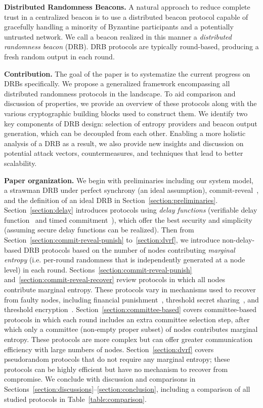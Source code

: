 \textbf{Distributed Randomness Beacons.}
A natural approach to reduce complete trust in a centralized beacon is to use a distributed beacon protocol capable of gracefully handling a minority of Byzantine participants and a potentially untrusted network. We call a beacon realized in this manner a \textit{distributed randomness beacon} (DRB). DRB protocols are typically round-based, producing a fresh random output in each round.

\textbf{Contribution.} The goal of the paper is to systematize the current progress on DRBs specifically. We propose a generalized framework encompassing all distributed randomness protocols in the landscape. To aid comparison and discussion of properties, we provide an overview of these protocols along with the various cryptographic building blocks used to construct them. We identify two key components of DRB design: selection of entropy providers and beacon output generation, which can be decoupled from each other. Enabling a more holistic analysis of a DRB as a result, we also provide new insights and discussion on potential attack vectors, countermeasures, and techniques that lead to better scalability.

\textbf{Paper organization.} We begin with preliminaries including our system model, a strawman DRB under perfect synchrony (an ideal assumption), commit-reveal~\cite{blum1983coin}, and the definition of an ideal DRB in Section~\ref{section:preliminaries}. Section~\ref{section:delay} introduces protocols using \textit{delay functions} (verifiable delay function~\cite{boneh2018verifiable} and timed commitment~\cite{boneh2000timed}), which offer the best security and simplicity (assuming secure delay functions can be realized). Then from Section~\ref{section:commit-reveal-punish} to~\ref{section:dvrf}, we introduce non-delay-based DRB protocols based on the number of nodes contributing \textit{marginal entropy} (i.e. per-round randomness that is independently generated at a node level) in each round. Sections~\ref{section:commit-reveal-punish} and~\ref{section:commit-reveal-recover} review protocols in which all nodes contribute marginal entropy. These protocols vary in mechanisms used to recover from faulty nodes, including financial punishment~\cite{youcai2017randao, david2020economically}, threshold secret sharing~\cite{schoenmakers1999simple, cascudo2017scrape}, and threshold encryption~\cite{desmedt1990Threshold}. Section~\ref{section:committee-based} covers committee-based protocols in which each round includes an extra committee selection step, after which only a committee (non-empty proper subset) of nodes contributes marginal entropy. These protocols are more complex but can offer greater communication efficiency with large numbers of nodes. Section~\ref{section:dvrf} covers pseudorandom protocols that do not require any marginal entropy; these protocols can be highly efficient but have no mechanism to recover from compromise. We conclude with discussion and comparisons in Sections~\ref{section:discussions}--\ref{section:conclusion}, including a comparison of all studied protocols in Table~\ref{table:comparison}.

